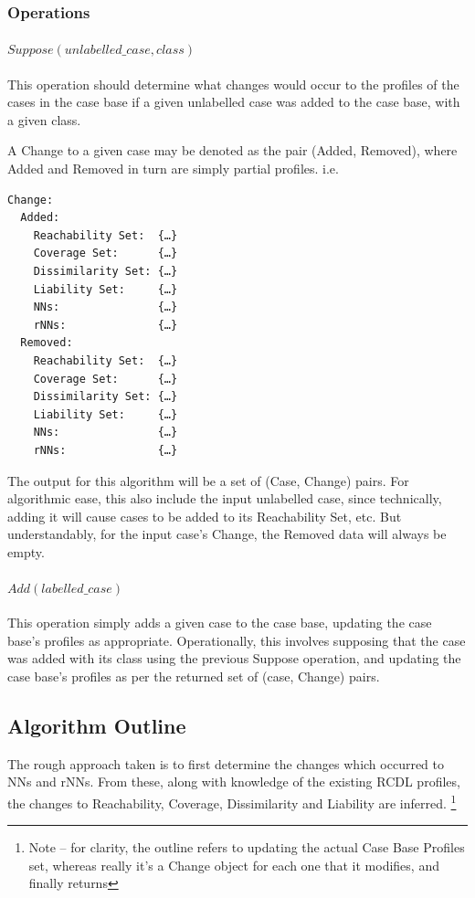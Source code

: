 \documentclass[a4paper,11pt]{report}
\begin{document}
\subsubsection{Operations}
\paragraph{$Suppose(unlabelled\_case, class)$}
This operation should determine what changes would occur to the profiles of the cases in the case base if a given unlabelled case was added to the case base, with a given class.

A Change to a given case may be denoted as the pair (Added, Removed), where Added and Removed in turn are simply partial profiles. i.e.
\begin{verbatim}
Change:
  Added:
    Reachability Set:  {…}
    Coverage Set:      {…}
    Dissimilarity Set: {…}
    Liability Set:     {…}
    NNs:               {…}
    rNNs:              {…}
  Removed:
    Reachability Set:  {…}
    Coverage Set:      {…}
    Dissimilarity Set: {…}
    Liability Set:     {…}
    NNs:               {…}
    rNNs:              {…}
\end{verbatim}

The output for this algorithm will be a set of (Case, Change) pairs. For algorithmic ease, this also include the input unlabelled case, since technically, adding it will cause cases to be added to its Reachability Set, etc. But understandably, for the input case's Change, the Removed data will always be empty.

\paragraph{$Add(labelled\_case)$}
This operation simply adds a given case to the case base, updating the case base's profiles as appropriate. Operationally, this involves supposing that the case was added with its class using the previous Suppose operation, and updating the case base's profiles as per the returned set of (case, Change) pairs.

\subsection{Algorithm Outline}
The rough approach taken is to first determine the changes which occurred to NNs and rNNs. From these, along with knowledge of the existing RCDL profiles, the changes to Reachability, Coverage, Dissimilarity and Liability are inferred. \footnote{Note – for clarity, the outline refers to updating the actual Case Base Profiles set, whereas really it's a Change object for each one that it modifies, and finally returns}
\end{document}
